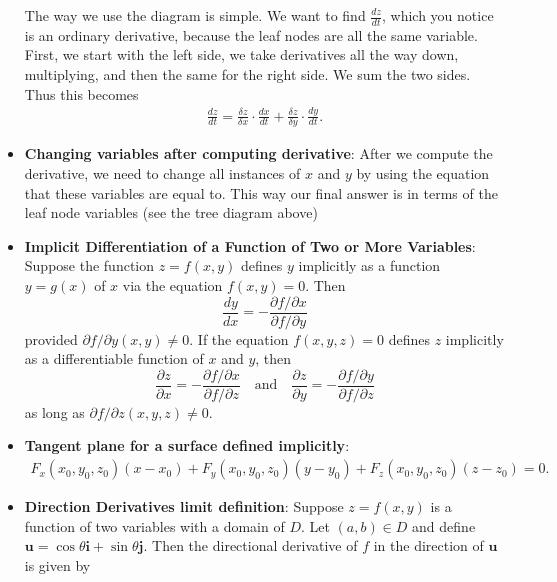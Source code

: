 \documentclass{report}
\begin{document}
\begin{itemize}
\begin{figure}[ht]
    \end{figure}
    \bigbreak \noindent 
    \bigbreak \noindent 
    The way we use the diagram is simple. We want to find $\frac{dz}{dt}$, which you notice is an ordinary derivative, because the leaf nodes are all the same variable. First, we start with the left side, we take derivatives all the way down, multiplying, and then the same for the right side. We sum the two sides. Thus this becomes
    \begin{align*}
        \frac{dz}{dt} = \frac{\delta z}{\delta x} \cdot \frac{dx}{dt}  + \frac{\delta z}{\delta y} \cdot \frac{dy}{dt}
    .\end{align*}
    \bigbreak \noindent 
    \item \textbf{Changing variables after computing derivative}: After we compute the derivative, we need to change all instances of $x$ and $y$ by using the equation that these variables are equal to. This way our final answer is in terms of the leaf node variables (see the tree diagram above)
    \item \textbf{Implicit Differentiation of a Function of Two or More Variables}:
        Suppose the function \(z = f(x,y)\) defines \(y\) implicitly as a function \(y = g(x)\) of \(x\) via the equation \(f(x,y) = 0\). Then
        \[
            \frac{dy}{dx} = -\frac{\partial f/\partial x}{\partial f/\partial y}
        \]
        provided \(\partial f/\partial y(x,y) \neq 0\).
        \bigbreak \noindent 
        If the equation \(f(x,y,z) = 0\) defines \(z\) implicitly as a differentiable function of \(x\) and \(y\), then
        \[
            \frac{\partial z}{\partial x} = -\frac{\partial f/\partial x}{\partial f/\partial z} \quad \text{and} \quad \frac{\partial z}{\partial y} = -\frac{\partial f/\partial y}{\partial f/\partial z}
        \]
        as long as \(\partial f/\partial z(x,y,z) \neq 0\).
    \item \textbf{Tangent plane for a surface defined implicitly}:
        \begin{align*}
            F_{x}(x_{0},y_{0},z_{0})(x-x_{0}) + F_{y}(x_{0}, y_{0}, z_{0})(y-y_{0}) + F_{z}(x_{0}, y_{0}, z_{0})(z-z_{0}) = 0
        .\end{align*}
    \item \textbf{Direction Derivatives limit definition}:
        Suppose $z=f(x,y)$ is a function of two variables with a domain of $D$. Let $(a,b) \in D$ and define $\mathbf{u}=\cos\theta \mathbf{i} + \sin\theta \mathbf{j}$. Then the directional derivative of $f$ in the direction of $\mathbf{u}$ is given by

\end{itemize}
\end{document}
